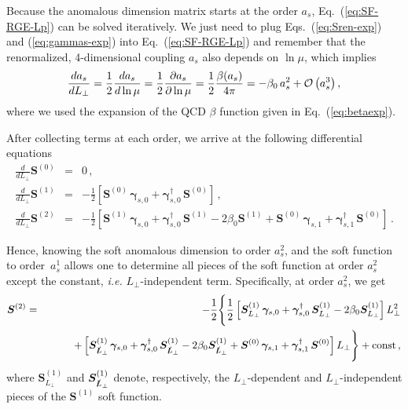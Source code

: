 \documentclass[a4paper,11pt]{article}
\newcommand{\bfS}{\bm{S}}
\newcommand{\ie}{{\it i.e. }}
\newcommand{\LT}{L_\perp}
\newcommand{\bfgamma}{\bm{\gamma}}
\newcommand{\order}[1]{{{\cal O}\left(#1\right)}}
\numberwithin{equation}{section}
\begin{document}
Because the anomalous dimension matrix starts at the order $a_s$,
Eq.~(\ref{eq:SF-RGE-Lp}) can be solved iteratively. We just need to plug
Eqs.~(\ref{eq:Sren-exp}) and (\ref{eq:gammas-exp}) into 
Eq.~(\ref{eq:SF-RGE-Lp}) and  remember that the renormalized, 4-dimensional
coupling $a_s$ also depends on $\ln\mu$, which implies
%
\begin{equation}
  \frac{d a_s}{dL_\perp} = \frac12 \frac{d a_s}{d\ln\mu} = 
  \frac12 \frac{\partial a_s}{\partial \ln\mu} = 
  \frac12 \frac{\beta(a_s)}{4\pi} = 
  - \beta_0\, a_s^2 + \order{a_s^3}\,,
\end{equation}
%
where we used the expansion of the QCD $\beta$ function given in
Eq.~(\ref{eq:betaexp}).

After collecting terms at each order, we
arrive at the following differential equations
%
\begin{eqnarray}
  \frac{d}{dL_\perp} \bfS^{(0)} & = &  0\,,
  \\
  \frac{d}{dL_\perp} \bfS^{(1)} & = & 
  -\frac12\left[
  \bfS^{(0)}\, \bfgamma_{s,0} + \bfgamma_{s,0}^\dagger\, \bfS^{(0)} 
  \right]\,,
  \\
  \frac{d}{dL_\perp} \bfS^{(2)} & = & 
  -\frac12\left[
  \bfS^{(1)}\, \bfgamma_{s,0} + \bfgamma_{s,0}^\dagger\, \bfS^{(1)}  
  - 2 \beta_0 \bfS^{(1)}  +
  \bfS^{(0)}\, \bfgamma_{s,1} + \bfgamma_{s,1}^\dagger\, \bfS^{(0)} 
  \right]\,.
\end{eqnarray}
 
Hence, knowing the soft anomalous dimension to order $a_s^2$, and the soft
function to order~$a_s^1$ allows one to determine all pieces of the soft
function at order $a_s^2$ except the constant, \ie $\LT$-independent term.
Specifically, at order $a_s^2$, we get
%
%
\begin{eqnarray}
  \bfS^{(2)} 
  & = & 
  -\frac12\Bigg\{
  \frac12\left[
  \bfS^{(1)}_{L_\perp}\, \bfgamma_{s,0} + 
  \bfgamma_{s,0}^\dagger\, \bfS^{(1)}_{L_\perp}  
  - 2 \beta_0 \bfS^{(1)}_{L_\perp} 
  \right] L_\perp^2
   \\
  & &
  \hspace{25pt} + \left[
  \bfS^{(1)}_{\slashed{L}_\perp}\, \bfgamma_{s,0} + 
  \bfgamma_{s,0}^\dagger\, \bfS^{(1)}_{\slashed{L}_\perp}  
  - 2 \beta_0 \bfS^{(1)}_{\slashed{L}_\perp} +
  \bfS^{(0)}\, \bfgamma_{s,1} + \bfgamma_{s,1}^\dagger\, \bfS^{(0)} 
  \right] L_\perp
  \Bigg\} 
  + \text{const}\,,
  \nonumber
\end{eqnarray}
%
where $\bfS^{(1)}_{L_\perp}$ and $\bfS^{(1)}_{\slashed{L}_\perp}$ denote,
respectively, the $L_\perp$-dependent and $L_\perp$-independent pieces of the
$\bfS^{(1)}$ soft function.
\end{document}

